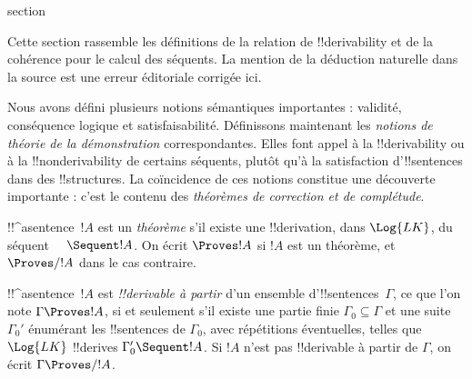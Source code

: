 \documentclass[11pt,a4paper,openany]{memoir}
\begin{document}


\begingroup
\expandafter\def\csname ol@sectioncs\endcsname{section}
\def\olfilename{proof-theoretic-notions}


\begin{editorial}
Cette section rassemble les définitions de la relation de
!!{derivability} et de la cohérence pour le calcul des séquents.
La mention de la déduction naturelle dans la source est une erreur
éditoriale corrigée ici.
\end{editorial}

      {}
      {}


\begin{explain}
Nous avons défini plusieurs notions sémantiques importantes : validité,
conséquence logique et satisfaisabilité. Définissons maintenant les
\emph{notions de théorie de la démonstration} correspondantes.
Elles font appel à la !!{derivability} ou à la !!{nonderivability}
de certains séquents, plutôt qu'à la satisfaction d'!!{sentence}s
dans des !!{structure}s. La coïncidence de ces notions constitue une
découverte importante : c'est le contenu des \emph{théorèmes de
correction et de complétude}.
\end{explain}

\begin{defn}[Théorèmes]
!!^a{sentence}~$!A$ est un \emph{théorème} s'il existe une
!!{derivation}, dans $\Log{LK}$, du séquent $\quad \Sequent !A$.
On écrit $\Proves !A$ si $!A$ est un théorème, et $\Proves/ !A$
dans le cas contraire.
\end{defn}

\begin{defn}[!!^{derivability}]
!!^a{sentence}~$!A$ est \emph{!!{derivable} à partir} d'un ensemble
d'!!{sentence}s~$\Gamma$, ce que l'on note $\Gamma \Proves !A$,
si et seulement s'il existe une partie finie $\Gamma_0 \subseteq \Gamma$
et une suite $\Gamma_0'$ énumérant les !!{sentence}s de $\Gamma_0$,
avec répétitions éventuelles, telles que $\Log{LK}$ !!{derive}s
$\Gamma_0' \Sequent !A$. Si $!A$ n'est pas !!{derivable} à partir
de $\Gamma$, on écrit $\Gamma \Proves/ !A$.
\end{defn}
\end{document}
